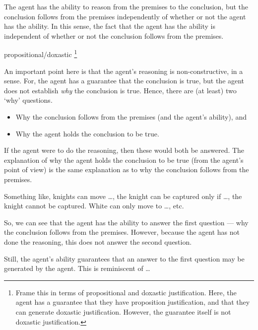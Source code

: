 \documentclass[10pt]{article}
\begin{document}
The agent has the ability to reason from the premises to the conclusion, but the conclusion follows from the premises independently of whether or not the agent has the ability.
In this sense, the fact that the agent has the ability is independent of whether or not the conclusion follows from the premises.




propositional/doxastic\nolinebreak
\footnote{
  Frame this in terms of propositional and doxastic justification.
  Here, the agent has a guarantee that they have proposition justification, and that they can generate doxastic justification.
  However, the guarantee itself is not doxastic justification.
}


\begin{note}[Constructive]
  An important point here is that the agent's reasoning is non-constructive, in a sense.
  For, the agent has a guarantee that the conclusion is true, but the agent does not establish \emph{why} the conclusion is true.
  Hence, there are (at least) two `why' questions.
  \begin{itemize}
  \item Why the conclusion follows from the premises (and the agent's ability), and
  \item Why the agent holds the conclusion to be true.
  \end{itemize}
  If the agent were to do the reasoning, then these would both be answered.
  The explanation of why the agent holds the conclusion to be true (from the agent's point of view) is the same explanation as to why the conclusion follows from the premises.

  Something like, knights can move \dots, the knight can be captured only if \dots, the knight cannot be captured.
  White can only move to \dots, etc.\

  So, we can see that the agent has the ability to answer the first question --- why the conclusion follows from the premises.
  However, because the agent has not done the reasoning, this does not answer the second question.

  Still, the agent's ability guarantees that an answer to the first question may be generated by the agent.
  This is reminiscent of \citeauthor{Davidson:2001aa} \dots
\end{note}
\end{document}
